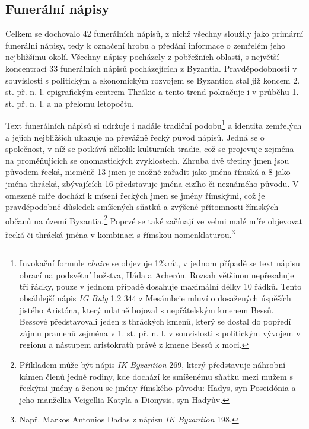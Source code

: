 
\subsection[funerální-nápisy-9]{Funerální nápisy}

Celkem se dochovalo 42 funerálních nápisů, z nichž všechny sloužily jako primární funerální nápisy, tedy k označení hrobu a předání informace o zemřelém jeho nejbližšímu okolí. Všechny nápisy pocházely z pobřežních oblastí, s největší koncentrací 33 funerálních nápisů pocházejících z Byzantia. Pravděpodobnosti v souvislosti s politickým a ekonomickým rozvojem se Byzantion stal již koncem 2. st. př. n. l. epigrafickým centrem Thrákie a tento trend pokračuje i v průběhu 1. st. př. n. l. a na přelomu letopočtu.

Text funerálních nápisů si udržuje i nadále tradiční podobu\footnote{Invokační formule {\em chaire} se objevuje 12krát, v jednom případě se text nápisu obrací na podsvětní božstva, Háda a Acherón. Rozsah většinou nepřesahuje tři řádky, pouze v jednom případě dosahuje maximální délky 10 řádků. Tento obsáhlejší nápis {\em IG Bulg} 1,2 344 z Mesámbrie mluví o dosažených úspěších jistého Aristóna, který udatně bojoval s nepřátelským kmenem Bessů. Bessové představovali jeden z thráckých kmenů, který se dostal do popředí zájmu pramenů zejména v 1. st. př. n. l. v souvislosti s politickým vývojem v regionu a nástupem aristokratů právě z kmene Bessů k moci.} a identita zemřelých a jejich nejbližších ukazuje na převážně řecký původ nápisů. Jedná se o společnost, v níž se potkává několik kulturních tradic, což se projevuje zejména na proměňujících se onomastických zvyklostech. Zhruba dvě třetiny jmen jsou původem řecká, nicméně 13  jmen je možné zařadit jako jména římská a 8  jako jména thrácká, zbývajících 16  představuje jména cizího či neznámého původu. V omezené míře dochází k mísení řeckých jmen se jmény římskými, což je pravděpodobně důsledek smíšených sňatků a zvýšené přítomnosti římských občanů na území Byzantia.\footnote{Příkladem může být nápis {\em IK Byzantion} 269, který představuje náhrobní kámen členů jedné rodiny, kde dochází ke smíšenému sňatku mezi mužem s řeckými jmény a ženou se jmény římského původu: Hadys, syn Poseidónia a jeho manželka Veigellia Katyla a Dionysis, syn Hadyův.} Poprvé se také začínají ve velmi malé míře objevovat řecká či thrácká jména v kombinaci s římskou nomenklaturou.\footnote{Např. Markos Antonios Dadas z nápisu {\em IK Byzantion} 198.}

